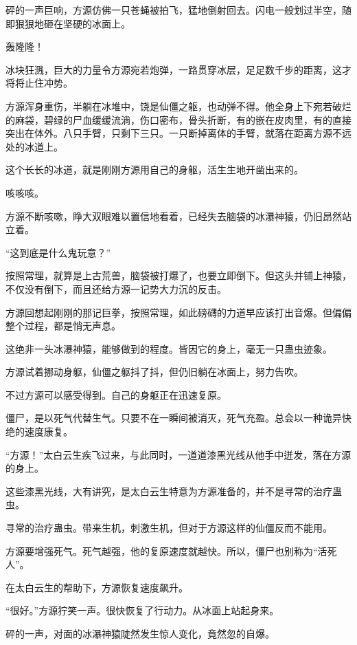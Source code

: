 
\begin{this_body}

砰的一声巨响，方源仿佛一只苍蝇被拍飞，猛地倒射回去。闪电一般划过半空，随即狠狠地砸在坚硬的冰面上。

轰隆隆！

冰块狂溅，巨大的力量令方源宛若炮弹，一路贯穿冰层，足足数千步的距离，这才将将止住冲势。

方源浑身重伤，半躺在冰堆中，饶是仙僵之躯，也动弹不得。他全身上下宛若破烂的麻袋，碧绿的尸血缓缓流淌，伤口密布，骨头折断，有的嵌在皮肉里，有的直接突出在体外。八只手臂，只剩下三只。一只断掉离体的手臂，就落在距离方源不远处的冰道上。

这个长长的冰道，就是刚刚方源用自己的身躯，活生生地开凿出来的。

咳咳咳。

方源不断咳嗽，睁大双眼难以置信地看着，已经失去脑袋的冰瀑神猿，仍旧昂然站立着。

“这到底是什么鬼玩意？”

按照常理，就算是上古荒兽，脑袋被打爆了，也要立即倒下。但这头并铺上神猿，不仅没有倒下，而且还给方源一记势大力沉的反击。

方源回想起刚刚的那记巨拳，按照常理，如此磅礴的力道早应该打出音爆。但偏偏整个过程，都是悄无声息。

这绝非一头冰瀑神猿，能够做到的程度。皆因它的身上，毫无一只蛊虫迹象。

方源试着挪动身躯，仙僵之躯抖了抖，但仍旧躺在冰面上，努力告吹。

不过方源可以感受得到。自己的身躯正在迅速复原。

僵尸，是以死气代替生气。只要不在一瞬间被消灭，死气充盈。总会以一种诡异快绝的速度康复。

“方源！”太白云生疾飞过来，与此同时，一道道漆黑光线从他手中迸发，落在方源的身上。

这些漆黑光线，大有讲究，是太白云生特意为方源准备的，并不是寻常的治疗蛊虫。

寻常的治疗蛊虫。带来生机，刺激生机，但对于方源这样的仙僵反而不能用。

方源要增强死气。死气越强，他的复原速度就越快。所以，僵尸也别称为“活死人”。

在太白云生的帮助下，方源恢复速度飙升。

“很好。”方源狞笑一声。很快恢复了行动力。从冰面上站起身来。

砰的一声，对面的冰瀑神猿陡然发生惊人变化，竟然忽的自爆。


\end{this_body}
